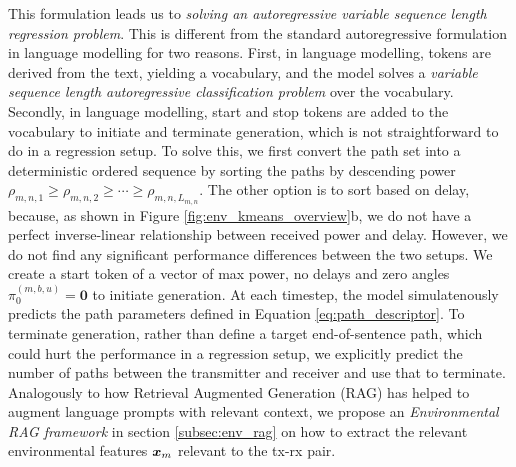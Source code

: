 This formulation leads us to \textit{solving an autoregressive variable sequence length regression problem}. This is different from the standard autoregressive formulation in language modelling for two reasons. First, in language modelling, tokens are derived from the text, yielding a vocabulary, and the model solves a \textit{variable sequence length autoregressive classification problem} over the vocabulary. Secondly, in language modelling, start and stop tokens are added to the vocabulary to initiate and terminate generation, which is not straightforward to do in a regression setup. To solve this, we first convert the path set into a deterministic ordered sequence by sorting the paths by descending power $\rho_{m,n,1} \ge \rho_{m,n,2} \ge \cdots \ge \rho_{m,n,L_{m,n}}$. The other option is to sort based on delay, because, as shown in Figure \ref{fig:env_kmeans_overview}{b}, we do not have a perfect inverse-linear relationship between received power and delay. However, we do not find any significant performance differences between the two setups. We create a start token of a vector of max power, no delays and zero angles $\pi^{(m,b,u)}_0 ={\textbf{0}}$ to initiate generation. At each timestep, the model simulatenously predicts the path parameters defined in Equation \ref{eq:path_descriptor}.  To terminate generation, rather than define a target end-of-sentence path, which could hurt the performance in a regression setup, we explicitly predict the number of paths between the transmitter and receiver and use that to terminate. Analogously to how Retrieval Augmented Generation (RAG) has helped to augment language prompts with relevant context, we propose an \textit{Environmental RAG framework }in section \ref{subsec:env_rag} on how to extract the relevant environmental features $\boldsymbol{x}_{m}$ relevant to the tx-rx pair. 

